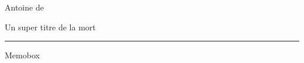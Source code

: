 \sffamily
{}
%
\hspace{0.05\textwidth}
%
%
\parbox[t] [0.991\textheight]{0.70\textwidth}{\large%
\vspace{30px}
\mbox{}\hfill{\Large{{Antoine de ~~~}}}\par
\vfill\mbox{}\vfill

	\begin{flushleft}
	\fontsize{25}{25}\selectfont Un super titre de la mort \end{flushleft}
	\hrule height 4pt
	\begin{flushright}
	\fontsize{20}{20}\selectfont Memobox ~ ~~
	\end{flushright}

\vfill
\vfill
\vfill
\vfill
\vfill
\vfill
\vfill
\vfill
\vfill
\vfill
\vfill
\mbox{}
    }%
